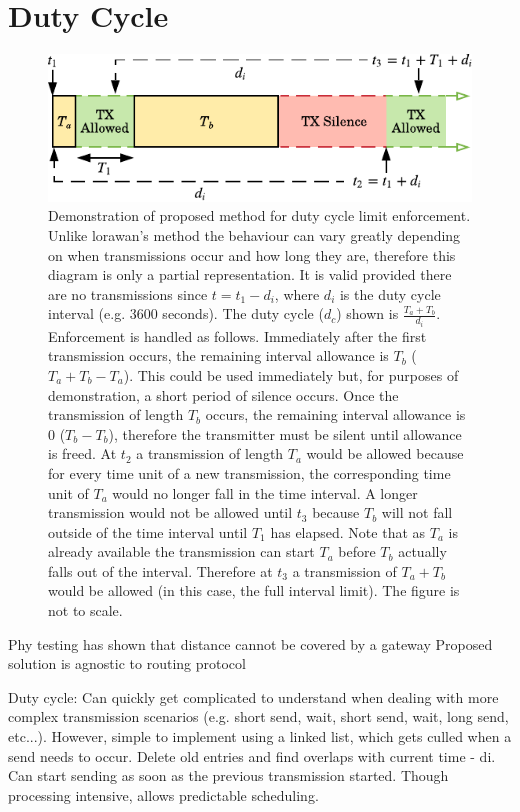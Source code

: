 \section{Duty Cycle}
\begin{figure}[H]
    \centering
   	\includegraphics{Figures/duty_cycle_proposed.pdf}
    \caption[Proposed duty cycle enforcement method]{
    Demonstration of proposed method for duty cycle limit enforcement. Unlike \ac{lorawan}'s method the behaviour can vary greatly depending on when transmissions occur and how long they are, therefore this diagram is only a partial representation. It is valid provided there are no transmissions since $t=t_1-d_i$, where $d_i$ is the duty cycle interval (e.g. 3600 seconds). The duty cycle ($d_c$) shown is $\frac{T_a + T_b}{d_i}$. Enforcement is handled as follows. Immediately after the first transmission occurs, the remaining interval allowance is $T_b$ ($T_a+T_b-T_a$). This could be used immediately but, for purposes of demonstration, a short period of silence occurs. Once the transmission of length $T_b$ occurs, the remaining interval allowance is 0 ($T_b - T_b$), therefore the transmitter must be silent until allowance is freed. At $t_2$ a transmission of length $T_a$ would be allowed because for every time unit of a new transmission, the corresponding time unit of $T_a$ would no longer fall in the time interval. A longer transmission would not be allowed until $t_3$ because $T_b$ will not fall outside of the time interval until $T_1$ has elapsed. Note that as $T_a$ is already available the transmission can start $T_a$ before $T_b$ actually falls out of the interval. Therefore at $t_3$ a transmission of $T_a + T_b$ would be allowed (in this case, the full interval limit). The figure is not to scale.    
    }
    \label{fig:proposed_duty_cycle}
\end{figure}

Phy testing has shown that distance cannot be covered by a gateway
Proposed solution is agnostic to routing protocol


Duty cycle:
Can quickly get complicated to understand when dealing with more complex transmission scenarios  (e.g. short send, wait, short send, wait, long send, etc...). However, simple to implement using a linked list, which gets culled when a send needs to occur. Delete old entries and find overlaps with current time - di. Can start sending as soon as the previous transmission started. Though processing intensive, allows predictable scheduling.

